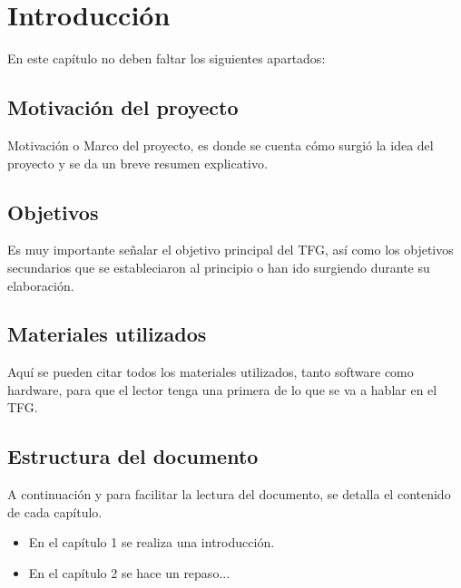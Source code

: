 \chapter{Introducción}



En este capítulo no deben faltar los siguientes apartados:

\section{Motivación del proyecto}

Motivación o Marco del proyecto, es donde se cuenta cómo surgió la idea del proyecto y se da un breve resumen explicativo.

\section{Objetivos}

Es muy importante señalar el objetivo principal del TFG, así como los objetivos secundarios que se estableciaron al principio o han ido surgiendo durante su elaboración.

\section{Materiales utilizados}

Aquí se pueden citar todos los materiales utilizados, tanto software como hardware, para que el lector tenga una primera de lo que se va a hablar en el TFG.

\section{Estructura del documento}

A continuación y para facilitar la lectura del documento, se detalla el contenido de cada capítulo.

\begin{itemize}
\item En el capítulo 1 se realiza una introducción.
\item En el capítulo 2 se hace un repaso...
\end{itemize}
